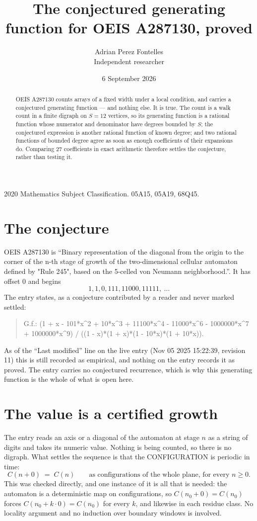\documentclass[11pt,a4paper]{article}
\title{The conjectured generating function for OEIS A287130, proved}
\author{Adrian Perez Fontelles\\ \small Independent researcher}
\date{6 September 2026}
\theoremstyle{plain}
\theoremstyle{definition}
\begin{document}
\maketitle

\begin{abstract}
OEIS A287130 counts arrays of a fixed width under a local condition, and carries a conjectured
generating function --- and nothing else. It is true. The count is a walk count in a finite
digraph on $S=12$ vertices, so its generating function is a rational function whose numerator
and denominator have degrees bounded by $S$; the conjectured expression is another rational
function of known degree; and two rational functions of bounded degree agree as soon as enough
coefficients of their expansions do. Comparing $27$ coefficients in exact arithmetic
therefore settles the conjecture, rather than testing it.
\end{abstract}

\noindent\small 2020 Mathematics Subject Classification. 05A15, 05A19, 68Q45.\normalsize

\section{The conjecture}

OEIS A287130 is ``Binary representation of the diagonal from the origin to the corner of the n-th stage of growth of the two-dimensional cellular automaton defined by "Rule 245", based on the 5-celled von Neumann neighborhood.''. It has offset $0$ and begins
\[
1, 1, 0, 111, 11000, 11111,\ \dots
\]
The entry states, as a conjecture contributed by a reader and never marked settled:
\begin{quote}
G.f.: (1 + x - 101*x\^{}2 + 10*x\^{}3 + 11100*x\^{}4 - 11000*x\^{}6 - 1000000*x\^{}7 + 1000000*x\^{}9) / ((1 - x)*(1 + x)*(1 - 10*x)*(1 + 10*x)).
\end{quote}
As of the ``Last modified'' line on the live entry (Nov 05 2025 15:22:39, revision 11) this is still
recorded as empirical, and nothing on the entry records it as proved. The entry carries no
conjectured recurrence, which is why this generating function is the whole of what is open
here.


\section{The value is a certified growth}

The entry reads an axis or a diagonal of the automaton at stage $n$ as a string of digits and
takes its numeric value. Nothing is being counted, so there is no digraph. What settles the
sequence is that the CONFIGURATION is periodic in time:
\[
C(n+0)\;=\;C(n)\qquad\text{as configurations of the whole plane, for every } n\ge 0.
\]
This was checked directly, and one instance of it is all that is needed: the automaton is a
deterministic map on configurations, so $C(n_0+0)=C(n_0)$ forces $C(n_0+k\cdot0)=C(n_0)$ for
every $k$, and likewise in each residue class. No locality argument and no induction over
boundary windows is involved.
\end{document}
